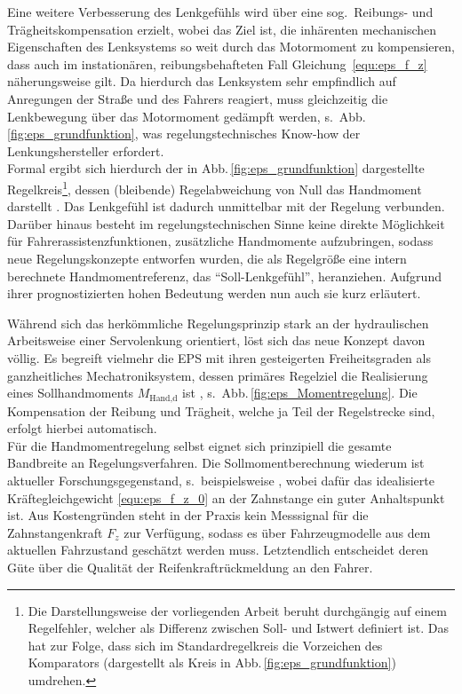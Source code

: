Eine weitere Verbesserung des Lenkgefühls wird über eine sog.\ Reibungs- und Trägheitskompensation erzielt, wobei das Ziel ist, die inhärenten mechanischen Eigenschaften des Lenksystems so weit durch das Motormoment zu kompensieren, dass auch im instationären, reibungsbehafteten Fall Gleichung~\eqref{equ:eps_f_z} näherungsweise gilt. Da hierdurch das Lenksystem sehr empfindlich auf Anregungen der Straße und des Fahrers reagiert, muss gleichzeitig  die Lenkbewegung über das Motormoment gedämpft werden, s.\ Abb.\,\ref{fig:eps_grundfunktion}, was regelungstechnisches Know-how der Lenkungshersteller erfordert. \\
Formal ergibt sich hierdurch der in Abb.\,\ref{fig:eps_grundfunktion} dargestellte Regelkreis\footnote{Die Darstellungsweise der vorliegenden Arbeit beruht durchgängig auf einem Regelfehler, welcher als Differenz zwischen Soll- und Istwert definiert ist. Das hat zur Folge, dass sich im Standardregelkreis die Vorzeichen des Komparators (dargestellt als Kreis in Abb.\,\ref{fig:eps_grundfunktion}) umdrehen.}, dessen (bleibende) Regelabweichung von Null das Handmoment darstellt \cite{pfeffer2013lenkungshandbuch}. Das Lenkgefühl ist dadurch unmittelbar mit der Regelung verbunden. Darüber hinaus besteht im regelungstechnischen Sinne keine direkte Möglichkeit für Fahrerassistenzfunktionen, zusätzliche Handmomente aufzubringen, %
sodass neue Regelungskonzepte entworfen wurden, die als Regelgröße eine intern berechnete Handmomentreferenz, das "`Soll-Lenkgefühl"', heranziehen. Aufgrund ihrer prognostizierten hohen Bedeutung werden nun auch sie kurz erläutert.
%


Während sich das herkömmliche Regelungsprinzip stark an der hydraulischen Arbeitsweise einer Servolenkung orientiert, löst sich das neue Konzept davon völlig. Es begreift vielmehr die EPS mit ihren gesteigerten Freiheitsgraden als ganzheitliches Mechatroniksystem, dessen primäres Regelziel die Realisierung eines Sollhandmoments $M_\text{{Hand},d}$ ist \cite{pfeffer2013lenkungshandbuch}, s.\ Abb.\,\ref{fig:eps_Momentregelung}. Die Kompensation der Reibung und Trägheit, welche ja Teil der Regelstrecke sind, erfolgt hierbei automatisch. \\
Für die Handmomentregelung selbst eignet sich prinzipiell die gesamte Bandbreite an Regelungsverfahren. Die Sollmomentberechnung wiederum ist aktueller Forschungsgegenstand, s.\ beispielsweise \cite{patentDE102010030986}, wobei dafür das idealisierte Kräftegleichgewicht \eqref{equ:eps_f_z_0} an der Zahnstange ein guter Anhaltspunkt ist. Aus Kostengründen steht in der Praxis kein Messsignal für die Zahnstangenkraft $F_z$ zur Verfügung, sodass es über Fahrzeugmodelle aus dem aktuellen Fahrzustand geschätzt werden muss. Letztendlich entscheidet deren Güte über die Qualität der Reifenkraftrückmeldung an den Fahrer.

